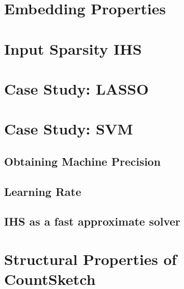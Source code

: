 \documentclass[twoside]{article}
\theoremstyle{definition}\newtheorem{thm}{Theorem}[section]
\theoremstyle{definition}\newtheorem{mydef}[thm]{Definition}
\theoremstyle{definition}\newtheorem{rem}[thm]{Remark}
\theoremstyle{definition}\newtheorem{prop}[thm]{Proposition}
\theoremstyle{definition}\newtheorem{example}[thm]{Example}
\theoremstyle{definition}\newtheorem{claim}[thm]{Claim}
\theoremstyle{definition}\newtheorem{Qu}[thm]{Question}
\theoremstyle{definition}\newtheorem{Lemma}[thm]{Lemma}
\theoremstyle{definition}\newtheorem{Cor}[thm]{Corollary}
\theoremstyle{definition}\newtheorem{Fact}[]{Fact}
\begin{document}
\section{Embedding Properties} \label{sec: subspace-embedding-results}



\section{Input Sparsity IHS} \label{sec: countsketch-ihs}







\section{Case Study: LASSO} \label{sec: ihs-lasso}


\section{Case Study: SVM}

\subsection{Obtaining Machine Precision}

\subsection{Learning Rate}

\subsection{IHS as a fast approximate solver}


\appendix

\section{Structural Properties of CountSketch} \label{sec: countsketch-proofs}




\end{document}

